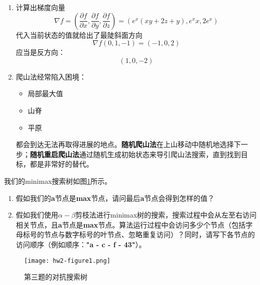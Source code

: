     \begin{solution}
        \begin{enumerate}
            \item 计算出梯度向量
            \begin{equation*}
                \nabla f = \left(\frac{\partial f}{\partial x},\frac{\partial f}{\partial y},\frac{\partial f}{\partial z}\right) = \left(e^x(xy+2z+y),e^xx,2e^x\right)
            \end{equation*}
            代入当前状态的值就给出了最陡斜面方向
            \begin{equation*}
                \nabla f(0,1,-1) = (-1,0,2)
            \end{equation*}
            应当是反方向：
            \begin{equation*}
                (1,0,-2)
            \end{equation*}
            \item 爬山法经常陷入困境：
            \begin{itemize}
                \item 局部最大值
                \item 山脊
                \item 平原
            \end{itemize}
            都会到达无法再取得进展的地点。\textbf{随机爬山法}在上山移动中随机地选择下一步；\textbf{随机重启爬山法}通过随机生成初始状态来导引爬山法搜索，直到找到目标，都是非常好的替代。
        \end{enumerate}
    \end{solution}

    \begin{problem}
        我们的minimax搜索树如图\ref{hw2-figure1}所示。
        \begin{enumerate}
            \item 假如我们的\textbf{a}节点是\textbf{max}节点，请问最后\textbf{a}节点会得到怎样的值？
            \item 假如我们使用$\alpha-\beta$剪枝法进行minimax树的搜索，搜索过程中会从左至右访问相关节点，且\textbf{a}节点是\textbf{max}节点。算法运行过程中会访问多少个节点（包括字母标号的节点与数字标号的叶节点、忽略重复访问）？同时，请写下各节点的访问顺序（例如顺序：\textbf{"a - c - f - 43"}）。
        \end{enumerate}
\begin{figure}[H]
  \centering
  \texttt{[image: hw2-figure1.png]}
  \caption{第三题的对抗搜索树}
  \label{hw2-figure1}
\end{figure}
    \end{problem}

